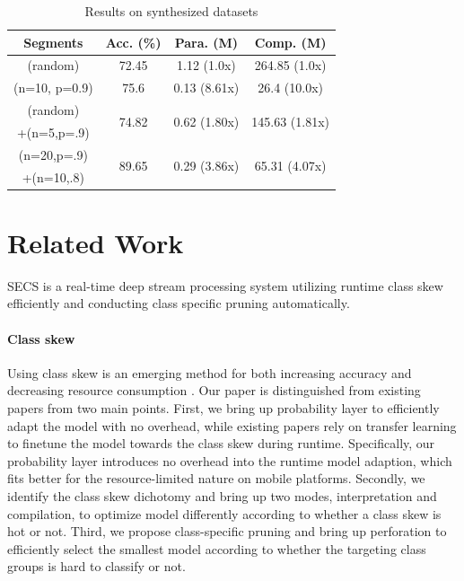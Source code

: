 \documentclass[pageno]{jpaper}
\begin{document}
\begin{table}
    \centering
    \begin{tabular}{c|ccc}
    \hline
    Segments  & Acc. (\%) & Para. (M) & Comp. (M)    \\
    \hline
    (random)      & 72.45 & 1.12 (1.0x) & 264.85 (1.0x) \\
    \hline
    (n=10, p=0.9) & 75.6 & 0.13 (8.61x)   & 26.4 (10.0x)\\
    \hline
    (random)      & \multirow{2}{*}{74.82} & \multirow{2}{*}{0.62 (1.80x)} & \multirow{2}{*}{145.63 (1.81x)}\\
    +(n=5,p=.9) &  & & \\
    \hline
    (n=20,p=.9)      & \multirow{2}{*}{89.65} & \multirow{2}{*}{0.29 (3.86x)}  & \multirow{2}{*}{65.31 (4.07x)} \\
    +(n=10,.8) &  & &\\
    \hline

    
    \end{tabular}
    \caption{Results on synthesized datasets}
    \label{tab:synthe}
\end{table}

\section{Related Work} \label{relatedWork}
SECS is a real-time deep stream processing system utilizing runtime class skew efficiently and conducting class specific pruning automatically.



\paragraph{Class skew}
Using class skew is an emerging method for both increasing accuracy and decreasing resource consumption \cite{han2016mcdnn, kang2017noscope, shen2016fast}. Our paper is distinguished from existing papers from two main points. First, we bring up probability layer to efficiently adapt the model with no overhead, while existing papers rely on transfer learning to finetune the model towards the class skew during runtime. Specifically, our probability layer introduces no overhead into the runtime model adaption, which fits better for the resource-limited nature on mobile platforms. Secondly, we identify the class skew dichotomy and bring up two modes, interpretation and compilation, to optimize model differently according to whether a class skew is hot or not. Third, we propose class-specific pruning and bring up perforation to efficiently select the smallest model according to whether the targeting class groups is hard to classify or not.
\end{document}
